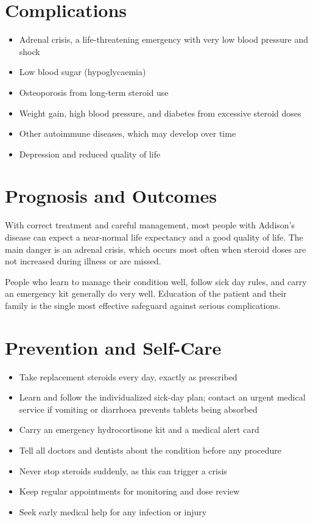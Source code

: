 \section*{Complications}
\begin{itemize}
    \item Adrenal crisis, a life-threatening emergency with very low blood pressure and shock
    \item Low blood sugar (hypoglycaemia)
    \item Osteoporosis from long-term steroid use
    \item Weight gain, high blood pressure, and diabetes from excessive steroid doses
    \item Other autoimmune diseases, which may develop over time
    \item Depression and reduced quality of life
\end{itemize}

\section*{Prognosis and Outcomes}
With correct treatment and careful management, most people with Addison's disease can expect a near-normal life expectancy and a good quality of life. The main danger is an adrenal crisis, which occurs most often when steroid doses are not increased during illness or are missed.

People who learn to manage their condition well, follow sick day rules, and carry an emergency kit generally do very well. Education of the patient and their family is the single most effective safeguard against serious complications.

\section*{Prevention and Self-Care}
\begin{itemize}
    \item Take replacement steroids every day, exactly as prescribed
    \item Learn and follow the individualized sick-day plan; contact an urgent medical service if vomiting or diarrhoea prevents tablets being absorbed
    \item Carry an emergency hydrocortisone kit and a medical alert card
    \item Tell all doctors and dentists about the condition before any procedure
    \item Never stop steroids suddenly, as this can trigger a crisis
    \item Keep regular appointments for monitoring and dose review
    \item Seek early medical help for any infection or injury
\end{itemize}


